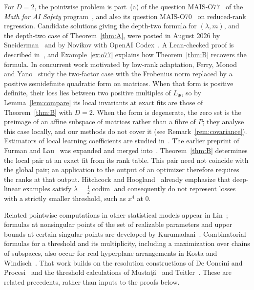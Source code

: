 \documentclass[11pt,a4paper]{article}
\theoremstyle{definition}
\theoremstyle{remark}
\numberwithin{equation}{section}
\newcommand{\codim}{\operatorname{codim}}
\begin{document}
For $D=2$, the pointwise problem is part~(a) of the question MAIS-O77~\cite{mais-o77} of the \emph{Math for AI Safety} program~\cite{levine-mais,mais-repo}, and also its question MAIS-O70~\cite{mais-o70} on reduced-rank regression. Candidate solutions giving the depth-two formula for $(\lambda,m)$, and the depth-two case of Theorem~\ref{thm:A}, were posted in August 2026 by Sneiderman~\cite{mais-issue-3} and by Novikov with OpenAI Codex~\cite{mais-issue-12}. A Lean-checked proof is described in~\cite{feld-o77}, and Example~\ref{ex:o77} explains how Theorem~\ref{thm:B} recovers the formula. In concurrent work motivated by low-rank adaptation, Ferry, Monod and Yano~\cite{ferry-monod-yano} study the two-factor case with the Frobenius norm replaced by a positive semidefinite quadratic form on matrices. When that form is positive definite, their loss lies between two positive multiples of $L_\Phi$, so by Lemma~\ref{lem:compare} its local invariants at exact fits are those of Theorem~\ref{thm:B} with $D=2$. When the form is degenerate, the zero set is the preimage of an affine subspace of matrices rather than a fibre of $P$; they analyse this case locally, and our methods do not cover it (see Remark~\ref{rem:covariance}). Estimators of local learning coefficients are studied in~\cite{lau-llc,hitchcock-hoogland}. The earlier preprint of Furman and Lau~\cite{furman-lau} was expanded and merged into~\cite{lau-llc}. Theorem~\ref{thm:B} determines the local pair at an exact fit from its rank table. This pair need not coincide with the global pair; an application to the output of an optimizer therefore requires the ranks at that output. Hitchcock and Hoogland~\cite[Remark~B.6]{hitchcock-hoogland} already emphasize that deep-linear examples satisfy $\lambda=\tfrac12\codim$ and consequently do not represent losses with a strictly smaller threshold, such as $x^4$ at $0$.

Related pointwise computations in other statistical models appear in Lin~\cite[Section~5]{lin}; formulas at nonsingular points of the set of realizable parameters and upper bounds at certain singular points are developed by Kurumadani~\cite{kurumadani,kurumadani-upper}. Combinatorial formulas for a threshold and its multiplicity, including a maximization over chains of subspaces, also occur for real hyperplane arrangements in Kosta and Windisch~\cite[Theorem~4.2 and Corollary~4.4]{kosta-windisch}. That work builds on the resolution constructions of De Concini and Procesi~\cite{deconcini-procesi} and the threshold calculations of Mustaţă~\cite{mustata-arrangements} and Teitler~\cite{teitler}. These are related precedents, rather than inputs to the proofs below.
\end{document}
